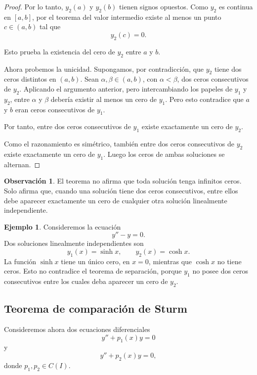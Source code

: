 \documentclass[12pt,a4paper]{article}
\theoremstyle{definition}
\newtheorem{ejemplo}[teorema]{Ejemplo}
\newtheorem{observacion}[teorema]{Observación}
\begin{document}
\begin{proof}
Por lo tanto, \(y_2(a)\) y \(y_2(b)\) tienen signos opuestos. Como \(y_2\) es continua en \([a,b]\), por el teorema del valor intermedio existe al menos un punto \(c\in(a,b)\) tal que
\[
y_2(c)=0.
\]

Esto prueba la existencia del cero de \(y_2\) entre \(a\) y \(b\).

Ahora probemos la unicidad. Supongamos, por contradicción, que \(y_2\) tiene dos ceros distintos en \((a,b)\). Sean \(\alpha,\beta\in(a,b)\), con \(\alpha<\beta\), dos ceros consecutivos de \(y_2\). Aplicando el argumento anterior, pero intercambiando los papeles de \(y_1\) y \(y_2\), entre \(\alpha\) y \(\beta\) debería existir al menos un cero de \(y_1\). Pero esto contradice que \(a\) y \(b\) eran ceros consecutivos de \(y_1\).

Por tanto, entre dos ceros consecutivos de \(y_1\) existe exactamente un cero de \(y_2\).

Como el razonamiento es simétrico, también entre dos ceros consecutivos de \(y_2\) existe exactamente un cero de \(y_1\). Luego los ceros de ambas soluciones se alternan.
\end{proof}

\begin{observacion}
El teorema no afirma que toda solución tenga infinitos ceros. Solo afirma que, cuando una solución tiene dos ceros consecutivos, entre ellos debe aparecer exactamente un cero de cualquier otra solución linealmente independiente.
\end{observacion}

\begin{ejemplo}
Consideremos la ecuación
\[
y''-y=0.
\]
Dos soluciones linealmente independientes son
\[
y_1(x)=\sinh x,\qquad y_2(x)=\cosh x.
\]
La función \(\sinh x\) tiene un único cero, en \(x=0\), mientras que \(\cosh x\) no tiene ceros. Esto no contradice el teorema de separación, porque \(y_1\) no posee dos ceros consecutivos entre los cuales deba aparecer un cero de \(y_2\).
\end{ejemplo}

\subsection{Teorema de comparación de Sturm}

Consideremos ahora dos ecuaciones diferenciales
\begin{equation}\label{eq:comp1}
y''+p_1(x)y=0
\end{equation}
y
\begin{equation}\label{eq:comp2}
y''+p_2(x)y=0,
\end{equation}
donde \(p_1,p_2\in C(I)\).
\end{document}
